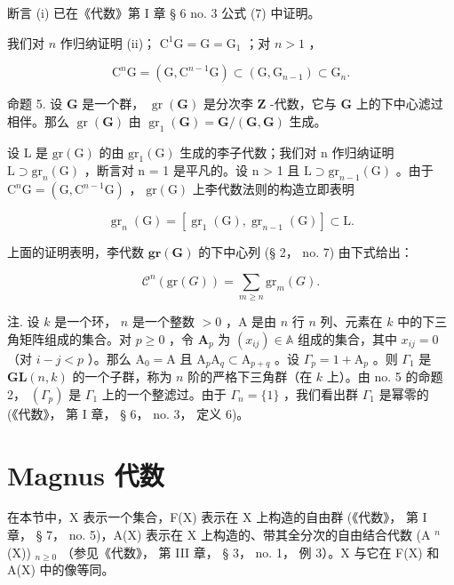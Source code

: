 断言 (i) 已在《代数》第 I 章 § 6 no. 3 公式 (7) 中证明。

我们对 \(n\) 作归纳证明 (ii)； \(\mathrm{C}^1\mathrm{G} = \mathrm{G} = \mathrm{G}_1\) ；对 \(n > 1\) ，

\[
\mathrm{C} ^ {n} \mathrm{G} = (\mathrm{G}, \mathrm{C} ^ {n - 1} \mathrm{G}) \subset (\mathrm{G}, \mathrm{G} _ {n - 1}) \subset \mathrm{G} _ {n}.
\]

命题 5. 设 \(\mathbf{G}\) 是一个群， \(\operatorname{gr}(\mathbf{G})\) 是分次李 \(\mathbf{Z}\) -代数，它与 \(\mathbf{G}\) 上的下中心滤过相伴。那么 \(\operatorname{gr}(\mathbf{G})\) 由 \(\operatorname{gr}_1(\mathbf{G}) = \mathbf{G}/(\mathbf{G},\mathbf{G})\) 生成。

设 L 是 \(\mathrm{gr}(\mathrm{G})\) 的由 \(\mathrm{gr}_{1}(\mathrm{G})\) 生成的李子代数；我们对 n 作归纳证明 \(\mathrm{L} \supset \mathrm{gr}_{n}(\mathrm{G})\) ，断言对 n = 1 是平凡的。设 n > 1 且 \(\mathrm{L} \supset \mathrm{gr}_{n-1}(\mathrm{G})\) 。由于 \(\mathrm{C}^{n}\mathrm{G} = (\mathrm{G}, \mathrm{C}^{n-1}\mathrm{G})\) ， \(\mathrm{gr}(\mathrm{G})\) 上李代数法则的构造立即表明

\[
\operatorname{gr} _ {n} (\mathrm{G}) = \left[ \operatorname{gr} _ {1} (\mathrm{G}), \operatorname{gr} _ {n - 1} (\mathrm{G}) \right] \subset \mathrm{L}.
\]

上面的证明表明，李代数 \(\mathbf{gr}(\mathbf{G})\) 的下中心列 (§ 2， no. 7) 由下式给出：

\[
\mathcal {C} ^ {n} (\mathrm{gr} (G)) = \sum_ {m \geqslant n} \mathrm{gr} _ {m} (G).\tag{29}
\]

注. 设 \(k\) 是一个环， \(n\) 是一个整数 \(>0\) ，A 是由 \(n\) 行 \(n\) 列、元素在 \(k\) 中的下三角矩阵组成的集合。对 \(p \geqslant 0\) ，令 \(\mathbf{A}_p\) 为 \((x_{ij}) \in \mathbb{A}\) 组成的集合，其中 \(x_{ij} = 0\) （对 \(i - j < p\) ）。那么 \(\mathrm{A}_0 = \mathrm{A}\) 且 \(\mathrm{A}_p\mathrm{A}_q \subset \mathrm{A}_{p + q}\) 。设 \(\Gamma_p = 1 + \mathrm{A}_p\) 。则 \(\Gamma_1\) 是 \(\mathbf{GL}(n,k)\) 的一个子群，称为 \(n\) 阶的严格下三角群（在 \(k\) 上）。由 no. 5 的命题 2， \((\Gamma_p)\) 是 \(\Gamma_1\) 上的一个整滤过。由于 \(\Gamma_n = \{1\}\) ，我们看出群 \(\Gamma_1\) 是幂零的 (《代数》， 第 I 章， § 6， no. 3， 定义 6)。

\section{Magnus 代数}

在本节中，X 表示一个集合，F(X) 表示在 X 上构造的自由群 (《代数》， 第 I 章， § 7， no. 5)，A(X) 表示在 X 上构造的、带其全分次的自由结合代数 (A \(^{n}\) (X)) \(_{n\geqslant0}\) （参见《代数》， 第 III 章， § 3， no. 1， 例 3）。X 与它在 F(X) 和 A(X) 中的像等同。

